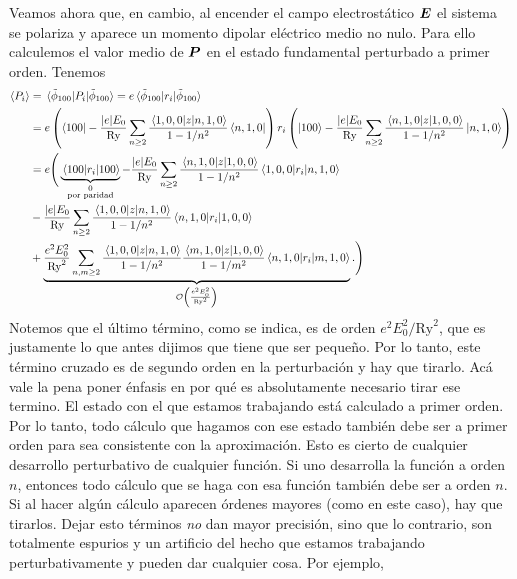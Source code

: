 \documentclass[10pt, a4paper]{article}
\newcommand{\Ry}{\ensuremath{\text{Ry}}}
\numberwithin{equation}{subsection}
\begin{document}
Veamos ahora que, en cambio, al encender el campo electrostático $\vb*{E}$ el
sistema se polariza y aparece un momento dipolar eléctrico medio no nulo. Para
ello calculemos el valor medio de $\vb*{P}$ en el estado fundamental
perturbado a primer orden. Tenemos
\begin{align}
  \expval{P_i}
  &= \matrixel*{\tilde{\phi}_{100}}{P_i}{\tilde{\phi}_{100}}
  = e\matrixel*{\tilde{\phi}_{100}}{r_i}{\tilde{\phi}_{100}} \nonumber \\
  &= e\left(
    \bra{100} - \frac{\abs{e}E_0}{\Ry}
    \sum_{n \geq 2} \frac{\matrixel{1,0,0}{z}{n,1,0}}{1 - 1/n^2} \bra{n,1,0}
    \right) r_i \left(
    \ket{100} - \frac{\abs{e}E_0}{\Ry}
    \sum_{n \geq 2} \frac{\matrixel{n,1,0}{z}{1,0,0}}{1 - 1/n^2} \ket{n,1,0}
    \right) \nonumber \\
  &= e\Bigg(
    \underbrace{\matrixel{100}{r_i}{100}}_{\substack{0 \\ \text{por paridad}}}
    - \frac{\abs{e}E_0}{\Ry} \sum_{n \geq 2}
    \frac{\matrixel{n,1,0}{z}{1,0,0}}{1 - 1/n^2} \matrixel{1,0,0}{r_i}{n,1,0}
    \nonumber \\
  &- \frac{\abs{e}E_0}{\Ry} \sum_{n \geq 2} \frac{\matrixel{1,0,0}{z}{n,1,0}}
    {1 - 1/n^2} \matrixel{n,1,0}{r_i}{1,0,0}
    \nonumber \\
  &+ \underbrace{\frac{e^2E_0^2}{\Ry^2}
    \sum_{n,m \geq 2} \frac{\matrixel{1,0,0}{z}{n,1,0}}{1 - 1/n^2}
    \frac{\matrixel{m,1,0}{z}{1,0,0}}{1 - 1/m^2}
    \matrixel{n,1,0}{r_i}{m,1,0}}_{\order{\frac{e^2E_0^2}{\Ry^2}}}.
    \Bigg)
\end{align}
Notemos que el último término, como se indica, es de orden $e^2E_0^2/\Ry^2$,
que es justamente lo que antes dijimos que tiene que ser pequeño. Por lo tanto,
este término cruzado es de segundo orden en la perturbación y hay que tirarlo.
Acá vale la pena poner énfasis en por qué es absolutamente necesario tirar ese
termino. El estado con el que estamos trabajando está calculado a primer orden.
Por lo tanto, todo cálculo que hagamos con ese estado también debe ser a primer
orden para sea consistente con la aproximación. Esto es cierto de cualquier
desarrollo perturbativo de cualquier función. Si uno desarrolla la función a
orden $n$, entonces todo cálculo que se haga con esa función también debe ser a
orden $n$. Si al hacer algún cálculo aparecen órdenes mayores (como en este
caso), hay que tirarlos. Dejar esto términos \emph{no} dan mayor precisión,
sino que lo contrario, son totalmente espurios y un artificio del hecho que
estamos trabajando perturbativamente y pueden dar cualquier cosa. Por ejemplo,
\end{document}
